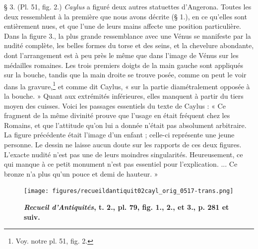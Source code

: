 \documentclass[a4paper, 11pt, oneside, polutonikogreek, french]{article}
\begin{document}
§ 3. (Pl. 51, fig. 2.) \emph{Caylus} a figuré deux autres statuettes d'Angerona. Toutes les deux ressemblent à la première que nous avons décrite (§ 1.), en ce qu'elles sont entièrement nues, et que l'une de leurs mains affecte une position particulière. Dans la figure 3., la plus grande ressemblance avec une Vénus se manifeste par la nudité complète, les belles formes du torse et des seins, et la chevelure abondante, dont l'arrangement est à peu près le même que dans l'image de Vénus sur les médailles romaines. Les trois premiers doigts de la main gauche sont appliqués sur la bouche, tandis que la main droite se trouve posée, comme on peut le voir dans la gravure,\footnote{Voy. notre pl. 51, fig. 2.} et comme dit Caylus, « sur la partie diamétralement opposée à la bouche. » Quant aux extrémités inférieures, elles manquent à partir du tiers moyen des cuisses. Voici les passages essentiels du texte de Caylus : « Ce fragment de la même divinité prouve que l'usage en était fréquent chez les Romains, et que l'attitude qu'on lui a donnée n'était pas absolument arbitraire. La figure précédente était l'image d'un enfant ; celle-ci représente une jeune personne. Le dessin ne laisse aucun doute sur les rapports de ces deux figures. L'exacte nudité n'est pas une de leurs moindres singularités. Heureusement, ce qui manque à ce petit monument n'est pas essentiel pour l'explication. ... Ce bronze n'a plus qu'un pouce et demi de hauteur. »
\clearpage
\vspace*{\fill}
\begin{figure}[H]
\centering
\texttt{[image: figures/recueildantiquit02cayl\_orig\_0517-trans.png]}
\caption{\bfseries \emph{Recueil d'Antiquités}, t. 2., pl. 79, fig. 1., 2., et 3., p. 281 et suiv.}
\end{figure}
\vspace*{\fill}
\clearpage
\end{document}
